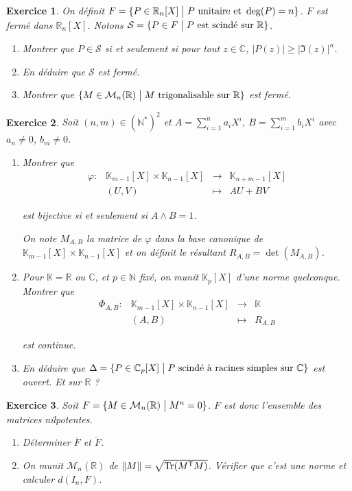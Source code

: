 \documentclass[12pt]{article}
\newtheorem{exercise}{Exercice}[section]
\theoremstyle{remark}
\theoremstyle{remark}
\newcommand{\K}{\mathbb{K}} \newcommand{\R}{\mathbb{R}}
\newcommand{\C}{\mathbb{C}} \newcommand{\Q}{\mathbb{Q}}
\newcommand{\N}{\mathbb{N}} \newcommand{\Z}{\mathbb{Z}}
\newcommand{\M}{\mathcal{M}} \renewcommand{\L}{\mathcal{L}}
\newcommand{\function}[5]{
	$$
	\begin{array}{rccl}
		#1: & #2 & \to & #3 \\
		& #4 & \mapsto & #5
	\end{array}
	$$
}
\begin{document}
\begin{exercise}
	On définit $F=\{P\in\R_n[X]\bigm| P\text{ unitaire et }\deg(P)=n\}$. $F$ est fermé dans $\R_{n}[X]$. Notons $\mathcal{S}=\{P\in F\bigm| P\text{ est scindé sur }\R\}$.
	\begin{enumerate}
		\item Montrer que $P\in\mathcal{S}$ si et seulement si pour tout $z\in\C$, $\vert P(z)\vert\geqslant \vert\Im(z)\vert^{n}$.
		\item En déduire que $\mathcal{S}$ est fermé.
		\item Montrer que $\{M\in\M_{n}(\R)\bigm| M\text{ trigonalisable sur }\R\}$ est fermé.
	\end{enumerate}
\end{exercise}

\begin{exercise}
	Soit $(n,m)\in(\N^{*})^{2}$ et $A=\sum_{i=1}^{n}a_{i}X^{i}$, $B=\sum_{i=1}^{m}b_{i}X^{i}$ avec $a_{n}\neq 0$, $b_{m}\neq0$.
	\begin{enumerate}
		\item Montrer que \function{\varphi}{\K_{m-1}[X]\times\K_{n-1}[X]}{\K_{n+m-1}[X]}{(U,V)}{AU+BV}
		est bijective si et seulement si $A\wedge B=1$.

		On note $M_{A,B}$ la matrice de $\varphi$ dans la base canonique de $\K_{m-1}[X]\times\K_{n-1}[X]$ et on définit le résultant $R_{A,B}=\det(M_{A,B})$.
		\item Pour $\K=\R$ ou $\C$, et $p\in\N$ fixé, on munit $\K_{p}[X]$ d'une norme quelconque. Montrer que \function{\Phi_{A,B}}{\K_{m-1}[X]\times\K_{n-1}[X]}{\K}{(A,B)}{R_{A,B}}
		est continue.
		\item En déduire que $\Delta=\{P\in\C_{p}[X]\bigm| P\text{ scindé à racines simples sur }\C\}$ est ouvert. Et sur $\R$ ?
	\end{enumerate}
\end{exercise}

\begin{exercise}
	Soit $F=\{M\in\M_{n}(\R)\bigm|M^{n}=0\}$. $F$ est donc l'ensemble des matrices nilpotentes.
	\begin{enumerate}
		\item Déterminer $\overline{F}$ et $\mathring{F}$.
		\item On munit $\M_{n}(\R)$ de $\Vert M\Vert=\sqrt{\operatorname{Tr}(M^{\mathsf{T}}M)}$. Vérifier que c'est une norme et calculer $d(I_{n},F)$.
	\end{enumerate}
\end{exercise}
\end{document}
